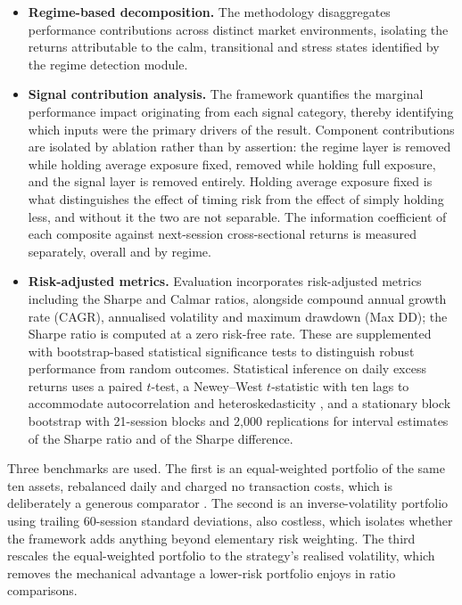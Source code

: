 \begin{itemize}
\item \textbf{Regime-based decomposition.} The methodology disaggregates performance
contributions across distinct market environments, isolating the returns attributable to
the calm, transitional and stress states identified by the regime detection module.
\item \textbf{Signal contribution analysis.} The framework quantifies the marginal
performance impact originating from each signal category, thereby identifying which
inputs were the primary drivers of the result. Component contributions are isolated by
ablation rather than by assertion: the regime layer is removed while holding average
exposure fixed, removed while holding full exposure, and the signal layer is removed
entirely. Holding average exposure fixed is what distinguishes the effect of timing risk
from the effect of simply holding less, and without it the two are not separable. The
information coefficient of each composite against next-session cross-sectional returns is
measured separately, overall and by regime.
\item \textbf{Risk-adjusted metrics.} Evaluation incorporates risk-adjusted metrics
including the Sharpe and Calmar ratios, alongside compound annual growth rate (CAGR),
annualised volatility and maximum drawdown (Max DD); the Sharpe ratio is computed at a
zero risk-free rate. These are supplemented with bootstrap-based statistical significance
tests to distinguish robust performance from random outcomes. Statistical inference on
daily excess returns uses a paired $t$-test, a Newey--West $t$-statistic with ten lags to
accommodate autocorrelation and heteroskedasticity \citep{newey87}, and a stationary block
bootstrap with 21-session blocks and 2{,}000 replications \citep{politis94} for interval
estimates of the Sharpe ratio and of the Sharpe difference.
\end{itemize}

Three benchmarks are used. The first is an equal-weighted portfolio of the same ten
assets, rebalanced daily and charged no transaction costs, which is deliberately a
generous comparator \citep{demiguel09}. The second is an inverse-volatility portfolio
using trailing 60-session standard deviations, also costless, which isolates whether the
framework adds anything beyond elementary risk weighting. The third rescales the
equal-weighted portfolio to the strategy's realised volatility, which removes the
mechanical advantage a lower-risk portfolio enjoys in ratio comparisons.

